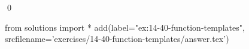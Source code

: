 
\begin{ex}
  \label{ex:14-40-function-templates}
  
  \qed
\end{ex}
\begin{python0}
from solutions import *
add(label="ex:14-40-function-templates",
    srcfilename='exercises/14-40-function-templates/answer.tex')
\end{python0}
